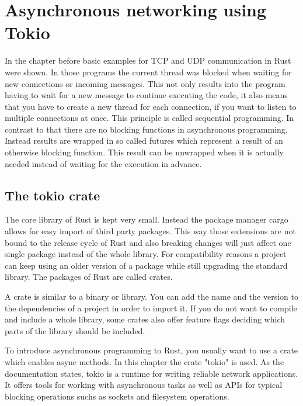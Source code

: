 
\section{Asynchronous networking using Tokio}
In the chapter before basic examples for TCP and UDP communication in Rust were shown. In those programs the current
thread was blocked when waiting for new connections or incoming messages. This not only results into the program having
to wait for a new message to continue executing the code, it also means that you have to create a new thread for each
connection, if you want to listen to multiple connections at once. This principle is called sequential programming. In
contrast to that there are no blocking functions in asynchronous programming. Instead results are wrapped in so called
futures which represent a result of an otherwise blocking function. This result can be unwrapped when it is actually
needed instead of waiting for the execution in advance. \cite{c18network}

\subsection{The tokio crate}
The core library of Rust is kept very small. Instead the package manager cargo allows for easy import of third party
packages. This way those extensions are not bound to the release cycle of Rust and also breaking changes will just
affect one single package instead of the whole library. For compatibility reasons a project can keep using an older
version of a package while still upgrading the standard library. The packages of Rust are called crates.

A crate is similar to a binary or library. You can add the name and the version to the dependencies of a project in
order to import it. If you do not want to compile and include a whole library, some crates also offer feature flags
deciding which parts of the library should be included.

To introduce asynchronous programming to Rust, you usually want to use a crate which enables async methods. In this
chapter the crate "tokio" is used. As the documentation \cite{tokio-doc} states, tokio is a runtime for writing
reliable network applications. It offers tools for working with asynchronous tasks as well as APIs for typical blocking
operations suchs as sockets and filesystem operations.

